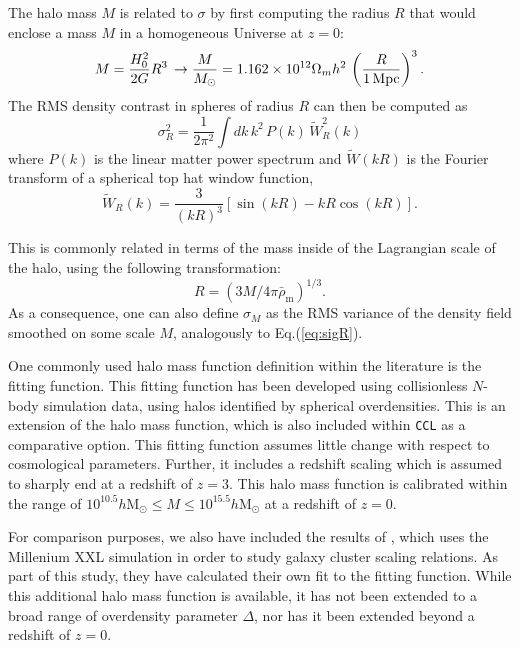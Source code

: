 \documentclass[\docopts]{\docclass}
\newcommand{\ccl}{{\tt CCL}\xspace}
\begin{document}
The halo mass $M$ is related to $\sigma$ by first computing the radius $R$ that would enclose a mass $M$ in a homogeneous Universe at $z=0$:
\begin{equation}
  M=\frac{H_0^2}{2G}R^3\,\rightarrow \frac{M}{M_\odot}=1.162\times10^{12}\Omega_mh^2\,\left(\frac{R}{1\,{\rm Mpc}}\right)^3.
\end{equation}
The RMS density contrast in spheres of radius $R$ can then be computed as
\begin{equation}
  \sigma_R^2 = \frac{1}{2\pi^2}\int dk\,k^2\,P(k)\,\tilde{W}_R^2(k)
  \label{eq:sigR}
\end{equation}
where $P(k)$ is the linear matter power spectrum and $\tilde{W}(kR)$ is the Fourier transform of a spherical top hat window function,
\begin{equation}
\tilde{W}_R(k) = \frac{3}{(kR)^3}[\sin(kR)-kR\cos(kR)].
\end{equation}

This is commonly related in terms of the mass inside of the Lagrangian scale of the halo, using the following transformation:
\begin{equation}
R = (3M/4\pi{\bar\rho_{\mathrm{m}}})^{1/3}.
\end{equation}
As a consequence, one can also define $\sigma_M$ as the RMS variance of the density field smoothed on some scale $M$, analogously to Eq.(\ref{eq:sigR}).

One commonly used halo mass function definition within the literature is the \citet{Tinker2010} fitting function. This fitting function has been developed using collisionless $N$-body simulation data, using halos identified by spherical overdensities. This is an extension of the \citet{Tinker2008} halo mass function, which is also included within \ccl as a comparative option. This fitting function assumes little change with respect to cosmological parameters. Further, it includes a redshift scaling which is assumed to sharply end at a redshift of $z = 3$. This halo mass function is calibrated within the range of $10^{10.5} h\mathrm{M}_\odot \leq M \leq 10^{15.5} h\mathrm{M}_\odot$ at a redshift of $z = 0$.

For comparison purposes, we also have included the results of \citet{Angulo2012}, which uses the Millenium XXL simulation in order to study galaxy cluster scaling relations. As part of this study, they have calculated their own fit to the \citet{Tinker2010} fitting function. While this additional halo mass function is available, it has not been extended to a broad range of overdensity parameter $\Delta$, nor has it been extended beyond a redshift of $z = 0$.
\end{document}
